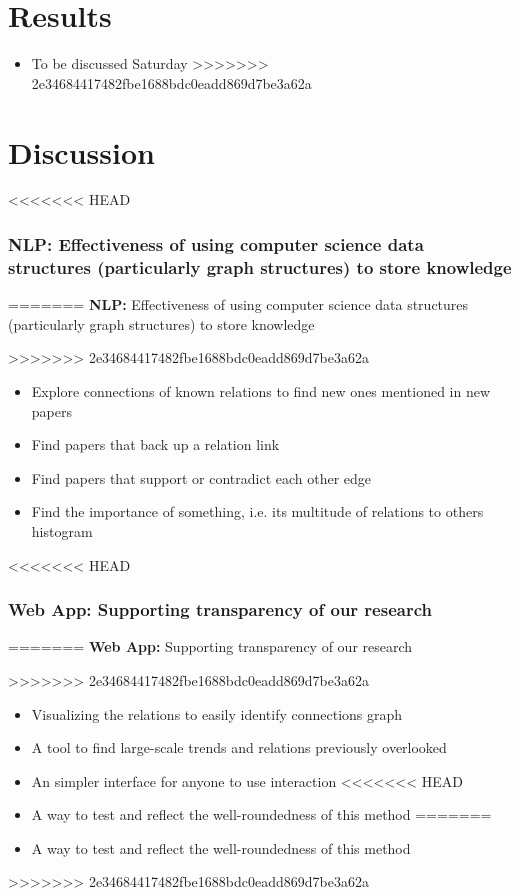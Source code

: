 \documentclass[11pt]{article}
\begin{document}
\begin{itemize}
\begin{itemize}
\begin{itemize}
\section{Results}

\begin{itemize}
	\item To be discussed Saturday
>>>>>>> 2e34684417482fbe1688bdc0eadd869d7be3a62a
\end{itemize}

\section{Discussion}

<<<<<<< HEAD
\subsubsection*{NLP: Effectiveness of using computer science data structures (particularly graph structures) to store knowledge}
=======
\textbf{NLP:} Effectiveness of using computer science data structures (particularly graph structures) to store knowledge

>>>>>>> 2e34684417482fbe1688bdc0eadd869d7be3a62a
\begin{itemize}
\item Explore connections of known relations to find new ones mentioned in new papers
\item Find papers that back up a relation link
\item Find papers that support or contradict each other edge
\item Find the importance of something, i.e. its multitude of relations to others histogram
\end{itemize}

<<<<<<< HEAD
\subsubsection*{Web App: Supporting transparency of our research}
=======
\textbf{Web App:} Supporting transparency of our research

>>>>>>> 2e34684417482fbe1688bdc0eadd869d7be3a62a
\begin{itemize}
\item Visualizing the relations to easily identify connections graph
\item A tool to find large-scale trends and relations previously overlooked
\item An simpler interface for anyone to use interaction
<<<<<<< HEAD
\item A way to test and reflect the well-roundedness of this method
=======
\item A way to test and reflect the well-roundedness of this method\end{itemize}
>>>>>>> 2e34684417482fbe1688bdc0eadd869d7be3a62a
\end{itemize}


\end{itemize}
\end{itemize}
\end{document}
